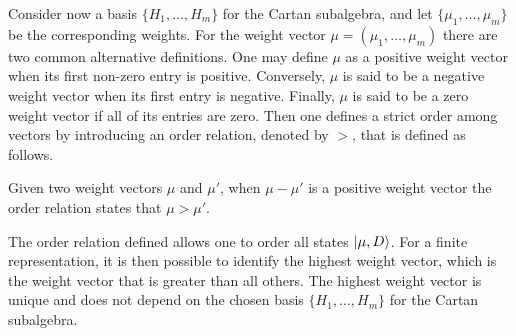 Consider now a basis $\{H_1,\dots,H_m\}$ for the Cartan subalgebra, and let $\{\mu_1,\dots,\mu_m\}$ be the corresponding weights. For the weight vector $\mu = (\mu_1,\dots,\mu_m)$ there are two common alternative definitions. One may define $\mu$ as a positive weight vector when its first non-zero entry is positive. Conversely, $\mu$ is said to be a negative weight vector when its first entry is negative. Finally, $\mu$ is said to be a zero weight vector if all of its entries are zero. Then one defines a strict order among vectors by introducing an order relation, denoted by $>$, that is defined as follows.
\begin{defn}
    Given two weight vectors $\mu$ and $\mu'$, when $\mu - \mu'$ is a positive weight vector the order relation states that $\mu > \mu'$.
\end{defn}
The order relation defined allows one to order all states $\ket{\mu,D}$. For a finite representation, it is then possible to identify the highest weight vector, which is the weight vector that is greater than all others. The highest weight vector is unique and does not depend on the chosen basis $\{H_1,\dots,H_m\}$ for the Cartan subalgebra.

